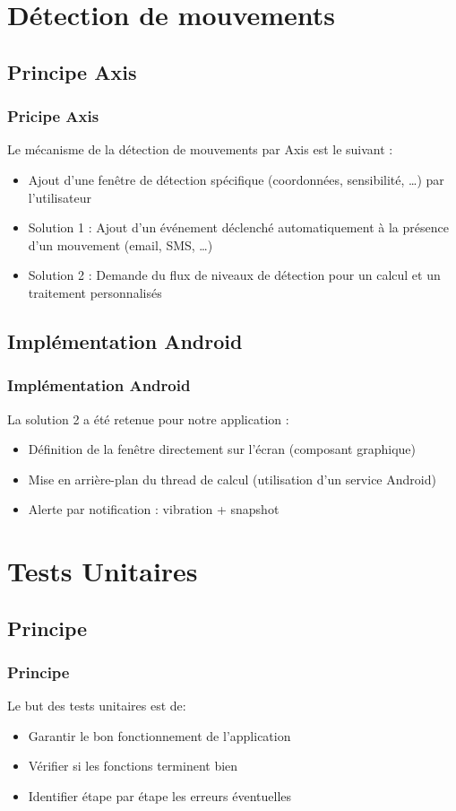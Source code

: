 \documentclass{beamer}
\begin{document}
\section{Détection de mouvements}
\subsection{Principe Axis}
 \begin{frame}
   \frametitle{Pricipe Axis}
	Le mécanisme de la détection de mouvements par Axis est le suivant :
   \begin{itemize}
	\item<2-> Ajout d'une fenêtre de détection spécifique (coordonnées,
	sensibilité, \ldots) par l'utilisateur
	\item<3-> Solution 1 : Ajout d'un événement déclenché automatiquement à la
	présence d'un mouvement (email, SMS, \ldots)
    \item<4-> Solution 2 : Demande du flux de niveaux de détection pour un
    calcul et un traitement personnalisés
   \end{itemize}
\end{frame}

\subsection{Implémentation Android}
 \begin{frame}
   \frametitle{Implémentation Android}
	La solution 2 a été retenue pour notre application :
	\begin{itemize}
	\item<2-> Définition de la fenêtre directement sur l'écran (composant
	graphique)
	\item<4-> Mise en arrière-plan du thread de calcul (utilisation d'un service
	Android)
    \item<5-> Alerte par notification : vibration + snapshot
   \end{itemize}
\end{frame}

\section{Tests Unitaires}
\subsection{Principe}
 \begin{frame}
   \frametitle{Principe}
Le but des tests unitaires est de:
\begin{itemize}
    \item<2-> Garantir le bon fonctionnement de l'application
    \item<3-> Vérifier si les fonctions terminent bien
    \item<4-> Identifier étape par étape les erreurs éventuelles
   \end{itemize}
\end{frame}
\end{document}
